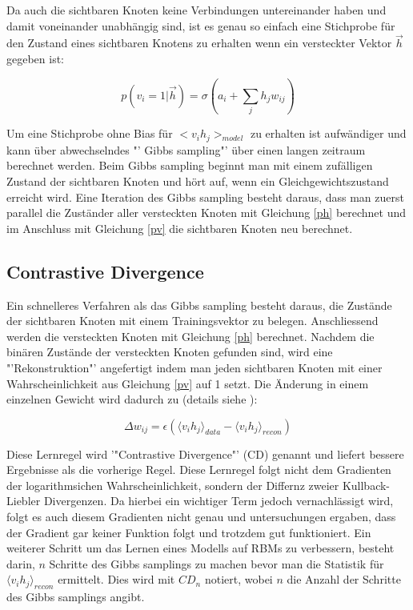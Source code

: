 \documentclass[12pt]{article}
\begin{document}
Da auch die sichtbaren Knoten keine Verbindungen untereinander haben und damit voneinander unabhängig sind, ist es genau so einfach eine Stichprobe für den Zustand eines sichtbaren Knotens zu erhalten wenn ein versteckter Vektor $\vec{h}$ gegeben ist:

\begin{equation}
p(v_i =1 | \vec{h}) = \sigma (a_i + \sum_{j} h_j w_{ij})
\label{pv}
\end{equation}

Um eine Stichprobe ohne Bias für $<v_i h_j>_{model}$ zu erhalten ist aufwändiger und kann über abwechselndes "' Gibbs sampling"' über einen langen zeitraum berechnet werden. Beim Gibbs sampling beginnt man mit einem zufälligen Zustand der sichtbaren Knoten und hört auf, wenn ein Gleichgewichtszustand erreicht wird. Eine Iteration des Gibbs sampling besteht daraus, dass man zuerst parallel die Zuständer aller versteckten Knoten mit Gleichung \ref{ph} berechnet und im Anschluss mit Gleichung \ref{pv} die sichtbaren Knoten neu berechnet.

\subsection{Contrastive Divergence}

Ein schnelleres Verfahren als das Gibbs sampling besteht daraus, die Zustände der sichtbaren Knoten mit einem Trainingsvektor zu belegen. Anschliessend werden die versteckten Knoten mit Gleichung \ref{ph} berechnet. Nachdem die binären Zustände der versteckten Knoten gefunden sind, wird eine "'Rekonstruktion"' angefertigt indem man jeden sichtbaren Knoten mit einer Wahrscheinlichkeit aus Gleichung \ref{pv} auf 1 setzt. Die Änderung in einem einzelnen Gewicht wird dadurch zu (details siehe \cite{digits}):

\begin{equation}
\Delta w_{ij} = \epsilon \left( \langle v_i h_j\rangle_{data} - \langle v_i h_j \rangle_{recon}\right)
\end{equation}

Diese Lernregel wird '"Contrastive Divergence"' (CD) genannt und liefert bessere Ergebnisse als die vorherige Regel. Diese Lernregel folgt nicht dem Gradienten der logarithmsichen Wahrscheinlichkeit, sondern der Differnz zweier Kullback-Liebler Divergenzen. Da hierbei ein wichtiger Term jedoch vernachlässigt wird, folgt es auch diesem Gradienten nicht genau und untersuchungen ergaben, dass der Gradient gar keiner Funktion folgt und trotzdem gut funktioniert. \cite{noconv} Ein weiterer Schritt um das Lernen eines Modells auf RBMs zu verbessern, besteht darin, $n$ Schritte des Gibbs samplings zu machen bevor man die Statistik für $\langle v_i h_j \rangle_{recon}$ ermittelt. Dies wird mit $CD_n$ notiert, wobei $n$ die Anzahl der Schritte des Gibbs samplings angibt.
\end{document}
